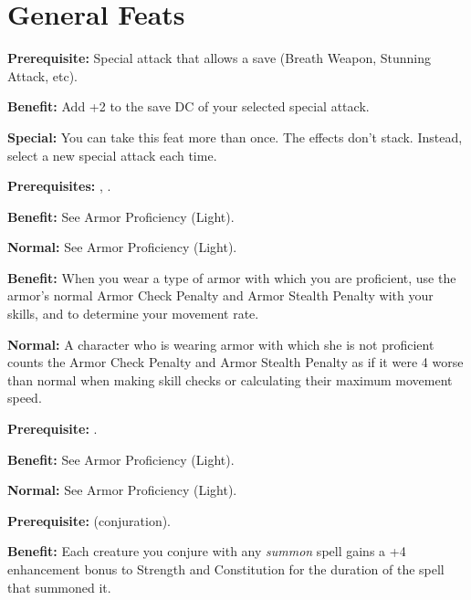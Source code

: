 \section{General Feats}


\textbf{Prerequisite:} Special attack that allows a save (Breath Weapon, Stunning Attack, etc).

\textbf{Benefit:} Add +2 to the save DC of your selected special attack.

\textbf{Special:} You can take this feat more than once. The effects don't stack. Instead, select a new special attack each time.


\textbf{Prerequisites:} , .

\textbf{Benefit:} See Armor Proficiency (Light).

\textbf{Normal:} See Armor Proficiency (Light).


\textbf{Benefit:} When you wear a type of armor with which you are proficient, use the armor's normal Armor Check Penalty and Armor Stealth Penalty with your skills, and to determine your movement rate.

\textbf{Normal:} A character who is wearing armor with which she is not proficient counts the Armor Check Penalty and Armor Stealth Penalty as if it were 4 worse than normal when making skill checks or calculating their maximum movement speed.


\textbf{Prerequisite:} .

\textbf{Benefit:} See Armor Proficiency (Light).

\textbf{Normal:} See Armor Proficiency (Light).


\textbf{Prerequisite:}  (conjuration).

\textbf{Benefit:} Each creature you conjure with any \textit{summon} spell gains a +4 enhancement bonus to Strength and Constitution for the duration of the spell that summoned it.

